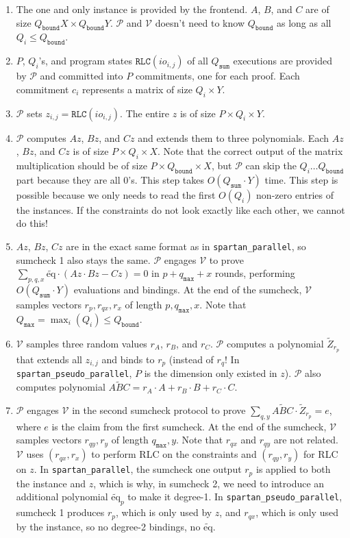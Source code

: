 \documentclass{article}
\newcommand{\red}[1] {\color{red}#1\color{black}}
\newcommand{\code}{\texttt}
\newcommand{\Qbound}{Q_{\mathtt{bound}}}
\newcommand{\Qsum}{Q_{\mathtt{sum}}}
\newcommand{\Qmax}{Q_{\mathtt{max}}}
\newcommand{\qmax}{q_{\mathtt{max}}}
\renewcommand{\P}{\mathcal{P}}
\newcommand{\V}{\mathcal{V}}
\newcommand{\RLC}{\mathtt{RLC}}
\newcommand{\Z}{\widetilde{Z}}
\newcommand{\ABC}{\widetilde{ABC}}
\newcommand{\eq}{\widetilde{\mbox{eq}}}
\begin{document}
\begin{enumerate}
    \item The one and only instance is provided by the frontend. $A$, $B$, and $C$ are of size $\Qbound X\times \Qbound Y$. $\P$ and $\V$ doesn't need to know $\Qbound$ as long as all $Q_i \leq \Qbound$.
    \item $P$, $Q_i$'s, and program states $\RLC(io_{i, j})$ of all $\Qsum$ executions are provided by $\P$ and committed into $P$ commitments, one for each proof. Each commitment $c_i$ represents a matrix of size $Q_i \times Y$.
    \item $\P$ sets $z_{i, j} = \RLC(io_{i, j})$. The entire $z$ is of size $P\times Q_i\times Y$.
    \item $\P$ computes $Az$, $Bz$, and $Cz$ and extends them to three polynomials. Each $Az$, $Bz$, and $Cz$ is of size $P\times Q_i \times X$. Note that the correct output of the matrix multiplication should be of size $P\times \Qbound \times X$, but $\P$ can skip the $Q_i \dots \Qbound$ part because they are all 0's. This step takes $O(\Qsum\cdot Y)$ time. \red{This step is possible because we only needs to read the first $O(Q_i)$ non-zero entries of the instances. If the constraints do not look exactly like each other, we cannot do this!}
    \item $Az$, $Bz$, $Cz$ are in the exact same format as in \code{spartan\_parallel}, so sumcheck 1 also stays the same. $\P$ engages $\V$ to prove $\sum_{p, q, x} \eq\cdot (Az \cdot Bz - Cz) = 0$ in $p + \qmax + x$ rounds, performing $O(\Qsum\cdot Y)$ evaluations and bindings. At the end of the sumcheck, $\V$ samples vectors $r_p, r_{qx}, r_x$ of length $p, \qmax, x$. Note that $\Qmax = \max_i(Q_i)\leq\Qbound$.
    \item $\V$ samples three random values $r_A$, $r_B$, and $r_C$. $\P$ computes a polynomial $\Z_{r_p}$ that extends all $z_{i, j}$ and binds to $r_p$ (instead of $r_q$! In \code{spartan\_pseudo\_parallel}, $P$ is the dimension only existed in $z$). $\P$ also computes polynomial $\ABC = r_A\cdot A + r_B\cdot B + r_C\cdot C$.
    \item $\P$ engages $\V$ in the second sumcheck protocol to prove $\sum_{q, y} \ABC \cdot \Z_{r_p} = e$, where $e$ is the claim from the first sumcheck. At the end of the sumcheck, $\V$ samples vectors $r_{qy}, r_y$ of length $\qmax, y$. Note that $r_{qx}$ and $r_{qy}$ are not related. $\V$ uses $(r_{qx}, r_x)$ to perform RLC on the constraints and $(r_{qy}, r_y)$ for RLC on $z$. \red{In \code{spartan\_parallel}, the sumcheck one output $r_p$ is applied to both the instance and $z$, which is why, in sumcheck 2, we need to introduce an additional polynomial $\eq_p$ to make it degree-1. In \code{spartan\_pseudo\_parallel}, sumcheck 1 produces $r_p$, which is only used by $z$, and $r_{qx}$, which is only used by the instance, so no degree-2 bindings, no $\eq$.}

\end{enumerate}
\end{document}
